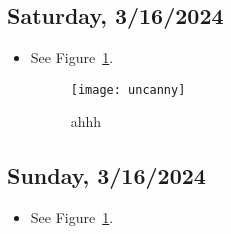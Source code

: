 \subsection*{Saturday, 3/16/2024}
\begin{itemize}
    \item See Figure~\ref{fig:uncanny}.
    \begin{figure}[ht]
        \centering
        \texttt{[image: uncanny]}
        \captionsetup{labelfont=bf, textfont=it}
        \caption{ahhh}
        \label{fig:uncanny}
    \end{figure}
\end{itemize}

\subsection*{Sunday, 3/16/2024}
\begin{itemize}
    \item See Figure~\ref{fig:uncanny}.
\end{itemize}
